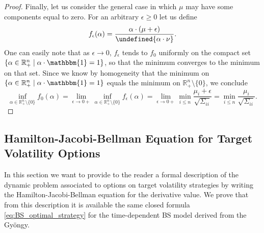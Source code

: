 \documentclass[11pt]{article}
\let\norm\undefined %
\DeclarePairedDelimiter\norm{\lVert}{\rVert}
\begin{document}
\begin{proof}
	Finally, let us consider the general case in which $\mu$ may have some components equal to zero. For an arbitrary $\epsilon \geq 0$ let us define
	\[
	f_{\epsilon}(\alpha) = \frac{\alpha \cdot (\mu+\epsilon)}{\norm{\alpha \cdot \nu}}.
	\]
	One can easily note that as $\epsilon \to 0$, $f_{\epsilon}$ tends to $f_{0}$ uniformly on the compact set $\{\alpha \in \mathbb{R}^n_+ \mid \alpha \cdot \mathbbm{1} = 1\}$, so that the minimum converges to the minimum on that set. Since we know by homogeneity that the minimum on $\{\alpha \in \mathbb{R}^n_+ \mid \alpha \cdot \mathbbm{1} = 1\}$ equals the minimum on $\mathbb{R}^n_+ \setminus \{0\}$, we conclude
	\[
	\inf_{\alpha \in \mathbb{R}_{+}^n \setminus \{0\}} f_0(\alpha) = 
	\lim_{\epsilon \to 0+} \inf_{\alpha \in \mathbb{R}_{+}^n \setminus \{0\}} f_{\epsilon}(\alpha) = 
	\lim_{\epsilon \to 0+} \min_{i\leq n} \frac{\mu_i+\epsilon}{\sqrt{\Sigma_{ii}}} =
	\min_{i\leq n} \frac{\mu_i}{\sqrt{\Sigma_{ii}}}.
	\]
\end{proof}

\subsection{Hamilton-Jacobi-Bellman Equation for Target Volatility Options}\label{subsec:HJB}
In this section we want to provide to the reader a formal description of the dynamic problem associated to options on target volatility strategies by writing the Hamilton-Jacobi-Bellman equation for the derivative value. We prove that from this description it is available the same closed formula \eqref{eq:BS_optimal_strategy} for the time-dependent BS model derived from the Gy\"ongy. 
\end{document}
